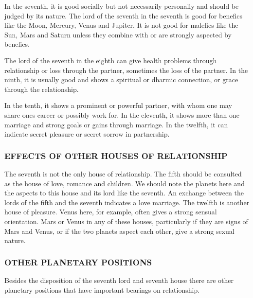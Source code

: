  

In the seventh, it is good socially but not necessarily personally and should be judged by its nature. The lord of the seventh in the seventh is good for benefics like the Moon, Mercury, Venus and Jupiter. It is not good for malefics like the Sun, Mars and Saturn unless they combine with or are strongly aspected by benefics.

 

The lord of the seventh in the eighth can give health problems through relationship or loss through the partner, sometimes the loss of the partner. In the ninth, it is usually good and shows a spiritual or dharmic connection, or grace through the relationship.

 

In the tenth, it shows a prominent or powerful partner, with whom one may share ones career or possibly work for. In the eleventh, it shows more than one marriage and strong goals or gains through marriage. In the twelfth, it can indicate secret pleasure or secret sorrow in partnership.

 

\subsubsection{EFFECTS OF OTHER HOUSES OF RELATIONSHIP}

 

The seventh is not the only house of relationship. The fifth should be consulted as the house of love, romance and children. We should note the planets here and the aspects to this house and its lord like the seventh. An exchange between the lords of the fifth and the seventh indicates a love marriage. The twelfth is another house of pleasure. Venus here, for example, often gives a strong sensual orientation. Mars or Venus in any of these houses, particularly if they are signs of Mars and Venus, or if the two planets aspect each other, give a strong sexual nature.

 

\subsubsection{OTHER PLANETARY POSITIONS}
Besides the disposition of the seventh lord and seventh house there are other planetary positions that have important bearings on relationship.




